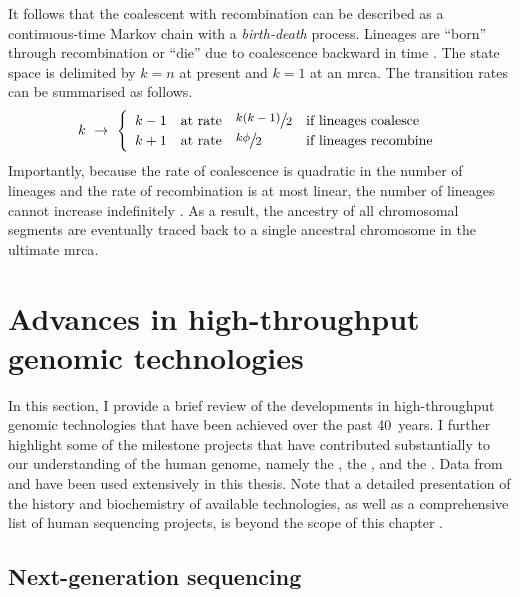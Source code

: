 It follows that the coalescent with recombination can be described as a continuous-time Markov chain with a \emph{birth-death} process.
Lineages are ``born'' through recombination or ``die'' due to coalescence backward in time \citep[\eg, see][]{tavare2004,wakeley2008}.
The state space is delimited by ${k=n}$ at present and ${k=1}$ at an \gls{mrca}.
The transition rates can be summarised as follows.
\begin{equation}
k ~\rightarrow~
\renewcommand{\arraystretch}{1.2}
\left\{
\begin{array}{llll}
	k-1  &  \text{at rate} & \rfrac{k(k-1)}{2} & \text{if lineages coalesce} \\
  k+1  &  \text{at rate} & \rfrac{k\phi}{2}  & \text{if lineages recombine}
\end{array}
\right.
\end{equation}
Importantly, because the rate of coalescence is quadratic in the number of lineages and the rate of recombination is at most linear, the number of lineages cannot increase indefinitely \citep{Wiuf:1997wf}.
As a result, the ancestry of all chromosomal segments are eventually traced back to a single ancestral chromosome in the ultimate \gls{mrca}.




%
\section{Advances in high-throughput genomic technologies}
\label{sec:technology}
%

In this section, I provide a brief review of the developments in high-throughput genomic technologies that have been achieved over the past 40~years.
I further highlight some of the milestone projects that have contributed substantially to our understanding of the human genome, namely the , the , and the .
Data from  and  have been used extensively in this thesis.
Note that a detailed presentation of the history and biochemistry of available technologies, as well as a comprehensive list of human sequencing projects, is beyond the scope of this chapter \citep[for review, \eg see][]{Metzker:2009ew,Naidoo:2011ip,Liu:2012hw,Mardis:2017cq}.


%
\subsection{Next-generation sequencing}
%

